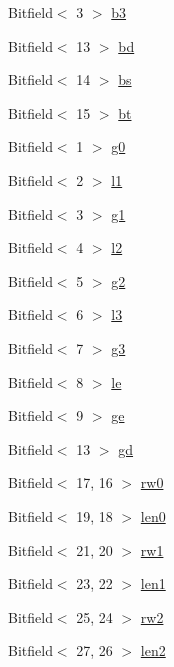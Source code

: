 \begin{DoxyCompactItemize}
Bitfield$<$ 3 $>$ \hyperlink{namespaceX86ISA_a8db94203bb67d6451e75b711c0f519ec}{b3}
\item 
Bitfield$<$ 13 $>$ \hyperlink{namespaceX86ISA_a226e6566a8cb9483be35f86053c46482}{bd}
\item 
Bitfield$<$ 14 $>$ \hyperlink{namespaceX86ISA_a6296733516f3f437db9b445ffd81ccc6}{bs}
\item 
Bitfield$<$ 15 $>$ \hyperlink{namespaceX86ISA_a426099f57666b3d095c8e32f9f43d415}{bt}
\item 
Bitfield$<$ 1 $>$ \hyperlink{namespaceX86ISA_adef9577bd4899360d75a05d0ee7a3b58}{g0}
\item 
Bitfield$<$ 2 $>$ \hyperlink{namespaceX86ISA_a9233b73b5bf9206e54338ca96baaf617}{l1}
\item 
Bitfield$<$ 3 $>$ \hyperlink{namespaceX86ISA_a5cf7c94d656713b8730df9d923462941}{g1}
\item 
Bitfield$<$ 4 $>$ \hyperlink{namespaceX86ISA_a86eb559dcbfd8485fe34aa7433759624}{l2}
\item 
Bitfield$<$ 5 $>$ \hyperlink{namespaceX86ISA_a7ec2866bfdc63c18ab67351dc7afb189}{g2}
\item 
Bitfield$<$ 6 $>$ \hyperlink{namespaceX86ISA_a2614728a5f2f1bf455fb7d1fa54254b5}{l3}
\item 
Bitfield$<$ 7 $>$ \hyperlink{namespaceX86ISA_ae2d96dd0637584e16a84072e0c727b53}{g3}
\item 
Bitfield$<$ 8 $>$ \hyperlink{namespaceX86ISA_a9352ac669640825c8070cbaa207e1806}{le}
\item 
Bitfield$<$ 9 $>$ \hyperlink{namespaceX86ISA_ac3dc5bc40d6559d609c4c768bd4be40f}{ge}
\item 
Bitfield$<$ 13 $>$ \hyperlink{namespaceX86ISA_ab7a6c846d5e085a7f875ebc62cfd84a2}{gd}
\item 
Bitfield$<$ 17, 16 $>$ \hyperlink{namespaceX86ISA_a44121ffb37c68510289c3adc945e6799}{rw0}
\item 
Bitfield$<$ 19, 18 $>$ \hyperlink{namespaceX86ISA_a916d8aabec6a33d7c5ddd92f8dcd4198}{len0}
\item 
Bitfield$<$ 21, 20 $>$ \hyperlink{namespaceX86ISA_aa9f93c677f27f510b53be79580c64f2b}{rw1}
\item 
Bitfield$<$ 23, 22 $>$ \hyperlink{namespaceX86ISA_a79082994f093fd864b38271ec71d6e64}{len1}
\item 
Bitfield$<$ 25, 24 $>$ \hyperlink{namespaceX86ISA_a95ac0d65616f4f0a91b568a8387baa39}{rw2}
\item 
Bitfield$<$ 27, 26 $>$ \hyperlink{namespaceX86ISA_a68557baea2b9949b886e4aa644b5937c}{len2}

\end{DoxyCompactItemize}
